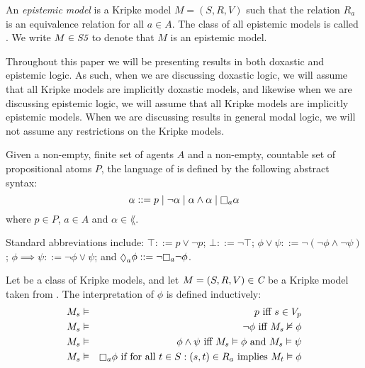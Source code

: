 \begin{definition}
An \textit{epistemic model} is a Kripke model $M = (S, R, V)$ such that the
relation $R_a$ is an equivalence relation for all $a \in A$. The class of all
epistemic models is called \classS{}. We write $M \in \textit{S5}{}$ to denote that
$M$ is an epistemic model.
\end{definition}

Throughout this paper we will be presenting results in both doxastic and
epistemic logic.  As such, when we are discussing doxastic logic, we will
assume that all Kripke models are implicitly doxastic models, and likewise when
we are discussing epistemic logic, we will assume that all Kripke models are
implicitly epistemic models. When we are discussing results in general modal
logic, we will not assume any restrictions on the Kripke models.

\begin{definition}
Given a non-empty, finite set of agents $A$ and a non-empty, countable set of
propositional atoms $P$, the language of \lang{} is defined by the following
abstract syntax:
$$
\alpha ::=  p \bnfalt
            \neg \alpha \bnfalt
            \alpha \land \alpha \bnfalt
            \knows_a \alpha
$$
where $p \in P$, $a \in A$ and $\alpha \in \lang{}$.
\end{definition}

Standard abbreviations include:
$\top ::= p \lor \neg p$;
$\bot ::= \neg \top$;
$\phi \lor \psi ::= \neg (\neg \phi \land \neg \psi)$;
$\phi \implies \psi ::= \neg \phi \lor \psi$;
and $\suspects_a \phi ::= \neg \knows_a \neg \phi$.

\begin{definition}
Let \classC{} be a class of Kripke models, and let $M = (S, R, V) \in \textit{C}$
be a Kripke model taken from \classC{}. The interpretation of $\phi$ is defined
inductively:
\begin{eqnarray*}
M_s &\entails& p \text{ iff } s \in V_p\\
M_s &\entails& \neg \phi \text{ iff } M_s \nentails \phi\\
M_s &\entails& \phi \land \psi \text{ iff } M_s \entails \phi \text{ and } M_s
\entails \psi\\
M_s &\entails& \knows_a \phi \text{ if for all } t \in S : (s, t) \in R_a \text{
implies } M_t \entails \phi
\end{eqnarray*}
\end{definition}

